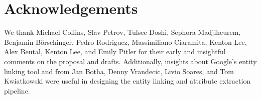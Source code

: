 \section*{Acknowledgements}
 We thank Michael Collins, Slav Petrov, Tulsee Doshi, Sephora Madjiheurem, Benjamin B\"orschinger, Pedro Rodriguez, Massimiliano Ciaramita, Kenton Lee, Alex Beutal, Kenton Lee, and Emily Pitler for their early and insightful comments on the proposal and drafts. Additionally, insights about Google's  entity linking tool and  from Jan Botha, Denny Vrandecic, Livio Soares, and Tom Kwiatkowski were useful in designing the entity linking and attribute extraction pipeline. %